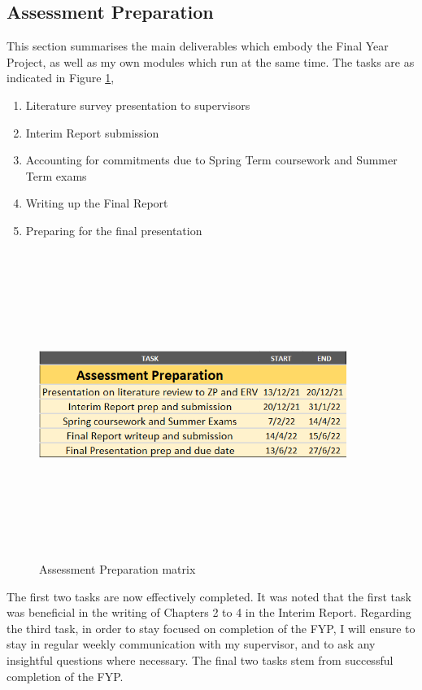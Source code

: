 \documentclass[11pt, a4paper]{article}
\begin{document}
\subsection{Assessment Preparation}
This section summarises the main deliverables which embody the Final Year Project, as well as my own modules which run at the same time. The tasks are as indicated in Figure \ref{gantt4}, \begin{enumerate}
    \item Literature survey presentation to supervisors
    \item Interim Report submission
    \item Accounting for commitments due to Spring Term coursework and Summer Term exams
    \item Writing up the Final Report
    \item Preparing for the final presentation
\end{enumerate} \begin{figure}[H]
    \centering
    \includegraphics[width=10cm,height=10cm,keepaspectratio]{Figures/part4_gantt.png}
    \caption{Assessment Preparation matrix}
    \label{gantt4}
\end{figure} \noindent The first two tasks are now effectively completed. It was noted that the first task was beneficial in the writing of Chapters 2 to 4 in the Interim Report. Regarding the third task, in order to stay focused on  completion of the FYP, I will ensure to stay in regular weekly communication with my supervisor, and to ask any insightful questions where necessary. The final two tasks stem from successful completion of the FYP. 
\newpage
\end{document}
